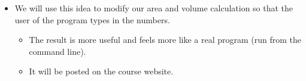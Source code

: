 \documentclass[letterpaper,10pt,english]{sphinxmanual}
\begin{document}
\begin{itemize}
%
\begin{sphinxVerbatim}[commandchars=\\\{\}]
  
  
\end{sphinxVerbatim}

\item {} 
We will use this idea to modify our area and volume calculation so
that the user of the program types in the numbers.
\begin{itemize}
\item {} 
The result is more useful and feels more like a real program
(run from the command line).

\item {} 
It will be posted on the course website.

\end{itemize}

\end{itemize}
\end{document}
